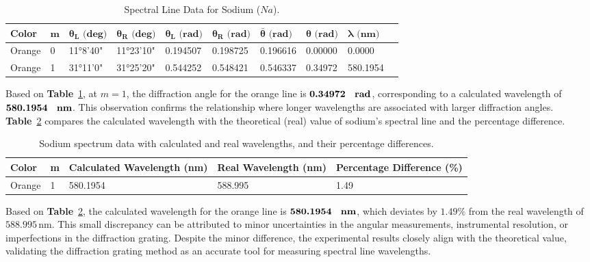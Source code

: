 \documentclass[a4paper,11pt]{article}
\begin{document}
\begin{table}[H]
  \centering
  \begin{tabular}{llllllllll}
  \toprule
  \textbf{Color} & \(\boldsymbol{m}\) & \(\boldsymbol{\theta_L \text{ (deg)}}\) & \(\boldsymbol{\theta_R \text{ (deg)}}\) & \(\boldsymbol{\theta_L \text{ (rad)}}\) & \(\boldsymbol{\theta_R \text{ (rad)}}\) & \(\boldsymbol{\bar \theta \text{ (rad)}}\) & \(\boldsymbol{\theta \text{ (rad)}}\) & \(\boldsymbol{\lambda \text{ (nm)}}\) \\
  \midrule
  Orange & 0 & 11°8'40"  & 11°23'10"  & 0.194507 & 0.198725 & 0.196616 & 0.00000 & 0.0000 \\
  Orange & 1 & 31°11'0"  & 31°25'20"  & 0.544252 & 0.548421 & 0.546337 & 0.34972 & 580.1954 \\
  \bottomrule
  \end{tabular}
  \caption{Spectral Line Data for Sodium (\(Na\)).}
  \label{tab:spectral_data_na}
\end{table}

\quad Based on \textbf{Table}~\ref{tab:spectral_data_na}, at \(m = 1\), the diffraction angle for the orange line is \(\textbf{0.34972 \, \text{rad}}\), corresponding to a calculated wavelength of \(\textbf{580.1954 \, \text{nm}}\). This observation confirms the relationship where longer wavelengths are associated with larger diffraction angles.\\

\textbf{Table}~\ref{tab:Sodium_spectrum} compares the calculated wavelength with the theoretical (real) value of sodium’s spectral line and the percentage difference.\\

\begin{table}[ht]
\centering
\begin{tabular}{lllll}
\toprule
\textbf{Color} & \textbf{m} & \textbf{Calculated Wavelength (nm)} & \textbf{Real Wavelength (nm)} & \textbf{Percentage Difference (\%)} \\
\midrule
Orange & 1 & 580.1954 & 588.995 & 1.49 \\
\bottomrule
\end{tabular}
\caption{Sodium spectrum data with calculated and real wavelengths, and their percentage differences.\cite{lighting_gallery_sodium_spectrum}\cite{nist_sodium_spectrum}}
\label{tab:Sodium_spectrum}
\end{table}

\qquad Based on \textbf{Table}~\ref{tab:Sodium_spectrum}, the calculated wavelength for the orange line is \(\textbf{580.1954 \, \text{nm}}\), which deviates by \(1.49\%\) from the real wavelength of \(588.995 \, \text{nm}\). This small discrepancy can be attributed to minor uncertainties in the angular measurements, instrumental resolution, or imperfections in the diffraction grating. Despite the minor difference, the experimental results closely align with the theoretical value, validating the diffraction grating method as an accurate tool for measuring spectral line wavelengths.
\end{document}
